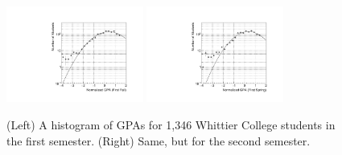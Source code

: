 \documentclass[../../../main.tex]{subfiles}
\begin{document}
\\
\vspace{0.25cm}

\begin{figure}
\centering
\includegraphics[width=0.4\textwidth]{figures/Nov15_plot3.pdf}
\includegraphics[width=0.4\textwidth]{figures/Nov15_plot9.pdf}
\caption{\label{fig:grade} (Left) A histogram of GPAs for 1,346 Whittier College students in the first semester.  (Right) Same, but for the second semester.}
\end{figure}
\end{document}
